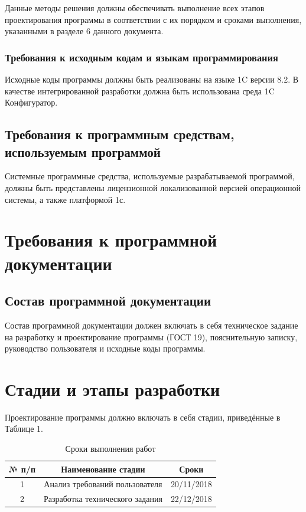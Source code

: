 \documentclass[14pt, a4paper]{extarticle}
\begin{document}
	Данные методы решения должны обеспечивать выполнение всех этапов проектирования программы в соответствии с их порядком и сроками выполнения, указанными в разделе 6 данного документа.
	\subsubsection{Требования к исходным кодам и языкам программирования}
	Исходные коды программы должны быть реализованы на языке 1C версии 8.2. В качестве интегрированной разработки должна быть использована среда 1C Конфигуратор.
	
	\subsection{Требования к программным средствам, используемым программой}
	Системные программные средства, используемые разрабатываемой программой, должны быть представлены лицензионной локализованной версией операционной системы, а также платформой 1с.
	
	\section{Требования к программной документации}
	\subsection{Состав программной документации}
	Состав программной документации должен включать в себя техническое задание на разработку и проектирование программы (ГОСТ 19), пояснительную записку, руководство пользователя и исходные коды программы.
	
	\section{Стадии и этапы разработки}
	Проектирование программы должно включать в себя стадии, приведённые в Таблице 1.\\
	\begin{table}[h!]
		\caption{Сроки выполнения работ}
		\begin{center}
			\label{tab:table1}
			\begin{tabular}{|c|c|c|}
				\hline
				№ п/п & Наименование стадии             & Сроки         \\
				\hline
				1     & Анализ требований пользователя  & 20/11/2018     \\
				\hline
				2     & Разработка технического задания & 22/12/2018     \\
				\hline
			\end{tabular}
		\end{center}
	\end{table}
	
\end{document}
